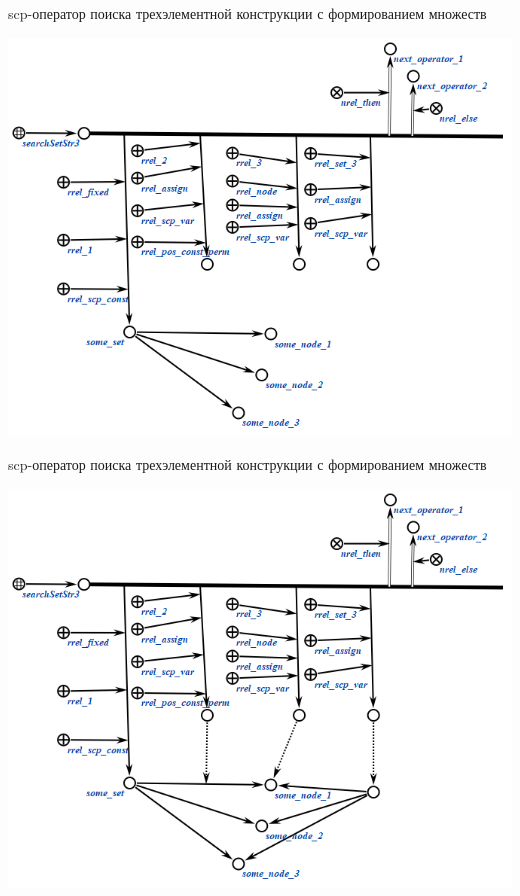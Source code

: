 \begin{frame}{scp-оператор поиска трехэлементной конструкции с формированием множеств}
	\topline
	\justifying
	\vspace{10mm}
	
	\begin{center}
		\includegraphics[scale=0.55]{figures/sd_scp/searchSetStr3.png}
	\end{center}
	
\end{frame}

\begin{frame}{scp-оператор поиска трехэлементной конструкции с формированием множеств}
	\topline
	\justifying
	\vspace{10mm}
	
	\begin{center}
		\includegraphics[scale=0.55]{figures/sd_scp/searchSetStr3_2.png}
	\end{center}
	
\end{frame}

